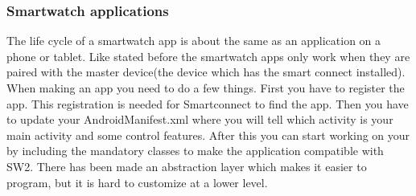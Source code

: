 \subsubsection{Smartwatch applications}
\label{subsubsec:sw_app}
The life cycle of a smartwatch app is about the same as an application on a phone or tablet. Like stated before the smartwatch apps only work when they are paired with the master device(the device which has the smart connect installed). When making an app you need to do a few things. First you have to register the app. This registration is needed for Smartconnect to find the app. \pend
Then you have to update your AndroidManifest.xml where you will tell which activity is your main activity and some control features. After this you can start working on your by including the mandatory classes to make the application compatible with SW2. There has been made an abstraction layer which makes it easier to program, but it is hard to customize at a lower level. 
